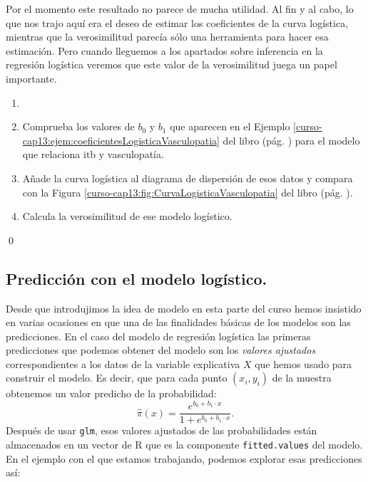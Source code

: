\documentclass[10pt,a4paper]{article}\usepackage[]{graphicx}\usepackage[]{color}
\begin{document}
Por el momento este resultado no parece de mucha utilidad. Al fin y al cabo, lo que nos trajo aquí era el deseo de estimar los coeficientes de la curva logística, mientras que la verosimilitud parecía sólo una herramienta para hacer esa estimación. Pero cuando lleguemos a los apartados sobre inferencia en la regresión logística veremos que este valor de la verosimilitud juega un papel importante.


\begin{ejercicio}
\label{tut13:ejercicio05}

\begin{enumerate}
\item[]

\item Comprueba los valores de $b_0$ y $b_1$ que aparecen en el Ejemplo \ref{curso-cap13:ejem:coeficientesLogisticaVasculopatia} del libro (pág. \pageref{curso-cap13:ejem:coeficientesLogisticaVasculopatia}) para el modelo que relaciona itb y vasculopatía.

\item Añade la curva logística al diagrama  de dispersión de esos datos y compara con la Figura \ref{curso-cap13:fig:CurvaLogisticaVasculopatia} del libro (pág. \pageref{curso-cap13:fig:CurvaLogisticaVasculopatia}).

\item Calcula la verosimilitud de ese modelo logístico.

\end{enumerate}

\qed
\end{ejercicio}


\subsection{Predicción con el modelo logístico.}
\label{tut13:subsec:PrediccionConModeloLogistico}

Desde que introdujimos la idea de modelo en esta parte del curso hemos insistido en varias ocasiones en que una de las finalidades básicas de los modelos son las predicciones. En el caso del modelo de regresión logística las primeras predicciones que podemos obtener del modelo son los {\em valores ajustados} correspondientes  a los datos de la variable explicativa $X$ que hemos usado para construir el modelo. Es decir, que para cada punto $(x_i, y_i)$ de la muestra obtenemos un valor predicho de la probabilidad:
\[\hat\pi(x)=\dfrac{e^{b_0+b_1\cdot x}}{1+e^{b_0+b_1\cdot x}}.\]
Después de usar {\tt glm}, esos valores ajustados de las probabilidades están almacenados en un vector de R que es la componente {\tt fitted.values} del modelo. En el ejemplo con el que estamos trabajando, podemos explorar esas predicciones así:
\end{document}

